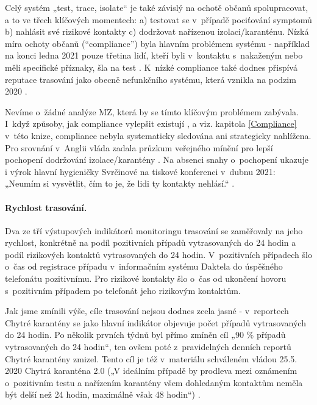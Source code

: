 Celý systém „test, trace, isolate“ je také závislý na ochotě občanů spolupracovat, a to ve třech klíčových momentech: a) testovat se v~případě pociťování symptomů b) nahlásit své rizikové kontakty c) dodržovat nařízenou izolaci/karanténu. Nízká míra ochoty občanů (“compliance”) byla hlavním problémem systému - například na konci ledna 2021 pouze třetina lidí, kteří byli v~kontaktu s~nakaženým nebo měli specifické příznaky, šla na test \cite{tr_PAQ02}. K~nízké compliance také dodnes přispívá reputace trasování jako obecně nefunkčního systému, která vznikla na podzim 2020 \cite{tr_bisop01}.

Nevíme o~žádné analýze MZ, která by se tímto klíčovým problémem zabývala. I~když způsoby, jak compliance vylepšit existují \cite{tr_bisop02}, a viz. kapitola \ref{Compliance} v~této knize, compliance nebyla systematicky sledována ani strategicky nahlížena. Pro srovnání v~Anglii vláda zadala průzkum veřejného mínění pro lepší pochopení dodržování izolace/karantény \cite{tr_ofns}. Na absenci snahy o~pochopení ukazuje i výrok hlavní hygieničky Svrčinové na tiskové konferenci v~dubnu 2021: „Neumím si vysvětlit, čím to je, že lidi ty kontakty nehlásí.“ \cite{tr_idnes01}.


\paragraph{Rychlost trasování.} Dva ze tří výstupových indikátorů monitoringu trasování se zaměřovaly na jeho rychlost, konkrétně na podíl pozitivních případů vytrasovaných do 24 hodin a podíl rizikových kontaktů vytrasovaných do 24 hodin. V~pozitivních případech šlo o~čas od registrace případu v~informačním systému Daktela do úspěšného telefonátu pozitivnímu. Pro rizikové kontakty šlo o~čas od ukončení hovoru s~pozitivním případem po telefonát jeho rizikovým kontaktům.

Jak jsme zmínili výše, cíle trasování nejsou dodnes zcela jasné - v~reportech Chytré karantény se jako hlavní indikátor objevuje počet případů vytrasovaných do 24 hodin. Po několik prvních týdnů byl přímo zmíněn cíl „90 \% případů vytrasovaných do 24 hodin“, ten ovšem poté z~pravidelných denních reportů Chytré karantény zmizel. Tento cíl je též v~materiálu schváleném vládou 25.5. 2020 Chytrá karanténa 2.0 („V ideálním případě by prodleva mezi oznámením o~pozitivním testu a nařízením karantény všem dohledaným kontaktům neměla být delší než 24 hodin, maximálně však 48 hodin“) \cite{tr_vlada01}.


